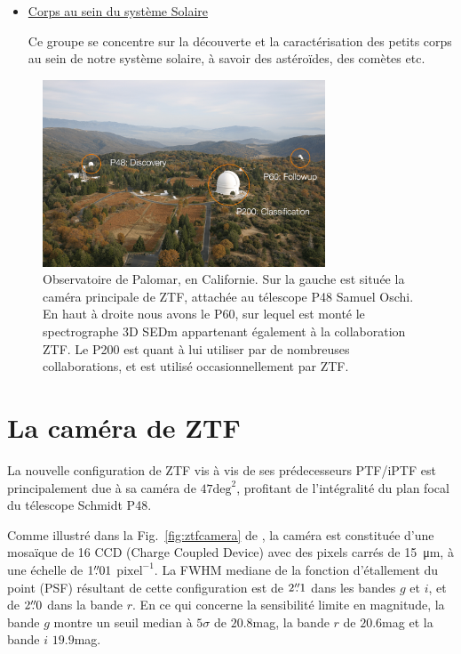 \documentclass[../main/main.tex]{subfiles}
\begin{document}
\begin{itemize}[label=$\bullet$]
    \item \underline{Corps au sein du système Solaire}

      Ce groupe se concentre sur la découverte et la caractérisation des
      petits corps au sein de notre système solaire, à savoir des
      astéroïdes, des comètes etc.
\end{itemize}



\begin{figure}
  \centering
  \includegraphics[width=0.75\textwidth]{../figures/02_ztf/palomar_obs-min.png}
  \caption{Observatoire de Palomar, en Californie. Sur la gauche est
    située la caméra principale de ZTF, attachée au télescope P48 Samuel
    Oschi. En haut à droite nous avons le P60, sur lequel est monté le
    spectrographe 3D SEDm appartenant également à la collaboration
    ZTF. Le P200 est quant à lui utiliser par de nombreuses
    collaborations, et est utilisé occasionnellement par ZTF.}
\label{fig:palomar_obs}
\end{figure}

\section{La caméra de ZTF}

La nouvelle configuration de ZTF vis à vis de ses prédecesseurs PTF/iPTF
est principalement due à sa caméra de $47\text{deg}^{2}$, profitant de
l'intégralité du plan focal du télescope Schmidt P48.

Comme illustré dans la Fig.~\ref{fig:ztfcamera} de \citet{BellmZTF2019}, la caméra est
constituée d'une mosaïque de 16 CCD (Charge Coupled Device) avec des
pixels carrés de \SI{15}{\micro\metre}, à une échelle de $1\overset{\prime\prime}{.}01$
$\text{pixel}^{-1}$. La FWHM mediane de la fonction d'étallement du point
(PSF) résultant de cette configuration est de $2\overset{\prime\prime}{.}1$ dans les bandes
$g$ et $i$, et de $2\overset{\prime\prime}{.}0$ dans la bande $r$. En ce qui concerne la
sensibilité limite en magnitude, la bande $g$ montre un seuil median à
$5\sigma$ de $20.8$mag, la bande $r$ de $20.6$mag et la bande $i$ $19.9$mag.
\end{document}
